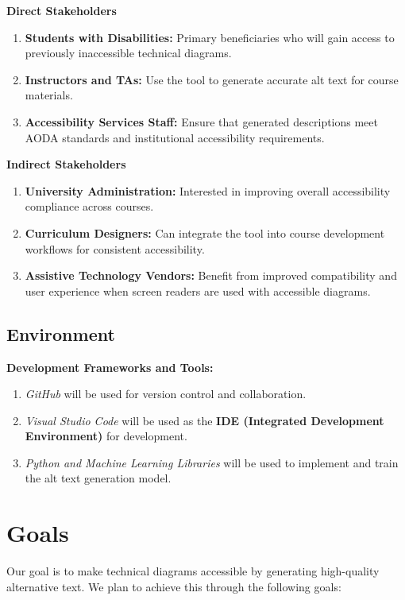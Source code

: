 \documentclass{article}
\begin{document}
\textbf{Direct Stakeholders}
\begin{enumerate}
    \item \textbf{Students with Disabilities:} Primary beneficiaries who will gain access to previously inaccessible technical diagrams. 
    \item \textbf{Instructors and TAs:} Use the tool to generate accurate alt text for course materials. 
    \item \textbf{Accessibility Services Staff:} Ensure that generated descriptions meet AODA standards and institutional accessibility requirements.
\end{enumerate}

\textbf{Indirect Stakeholders}
\begin{enumerate}
    \item \textbf{University Administration:} Interested in improving overall accessibility compliance across courses.
    \item \textbf{Curriculum Designers:} Can integrate the tool into course development workflows for consistent accessibility.
    \item \textbf{Assistive Technology Vendors:} Benefit from improved compatibility and user experience when screen readers are used with accessible diagrams.
\end{enumerate}

\subsection{Environment}

\textbf{Development Frameworks and Tools:}
\begin{enumerate}
    \item \textit{GitHub} will be used for version control and collaboration.
    \item \textit{Visual Studio Code} will be used as the \textbf{IDE (Integrated Development Environment)} for development.
    \item \textit{Python and Machine Learning Libraries} will be used to implement and train the alt text generation model.
\end{enumerate}

\section{Goals}

Our goal is to make technical diagrams accessible by generating high-quality alternative text. 
We plan to achieve this through the following goals:
\end{document}
